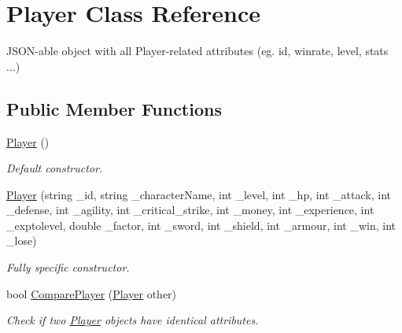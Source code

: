 \hypertarget{class_player}{}\section{Player Class Reference}
\label{class_player}


J\+S\+O\+N-\/able object with all Player-\/related attributes (eg. id, winrate, level, stats ...)  


\subsection*{Public Member Functions}
\begin{DoxyCompactItemize}
\item 
\mbox{\label{class_player_a712a726b07cf901c040116d6d0c5cc66}} 
\mbox{\hyperlink{class_player_a712a726b07cf901c040116d6d0c5cc66}{Player}} ()
\begin{DoxyCompactList}\small\item\em Default constructor. \end{DoxyCompactList}\item 
\mbox{\label{class_player_ad275d2e546547d19fca625bad0dd9dc6}} 
\mbox{\hyperlink{class_player_ad275d2e546547d19fca625bad0dd9dc6}{Player}} (string \+\_\+id, string \+\_\+character\+Name, int \+\_\+level, int \+\_\+hp, int \+\_\+attack, int \+\_\+defense, int \+\_\+agility, int \+\_\+critical\+\_\+strike, int \+\_\+money, int \+\_\+experience, int \+\_\+exptolevel, double \+\_\+factor, int \+\_\+sword, int \+\_\+shield, int \+\_\+armour, int \+\_\+win, int \+\_\+lose)
\begin{DoxyCompactList}\small\item\em Fully specific constructor. \end{DoxyCompactList}\item 
\mbox{\label{class_player_a4801fed9ec34d0eac42ca4c474b3e584}} 
bool \mbox{\hyperlink{class_player_a4801fed9ec34d0eac42ca4c474b3e584}{Compare\+Player}} (\mbox{\hyperlink{class_player}{Player}} other)
\begin{DoxyCompactList}\small\item\em Check if two \mbox{\hyperlink{class_player}{Player}} objects have identical attributes. \end{DoxyCompactList}\end{DoxyCompactItemize}
